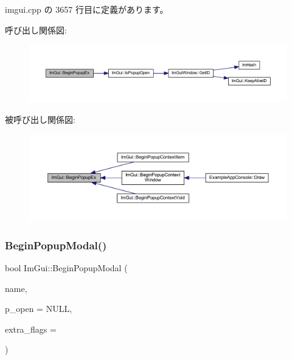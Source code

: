  imgui.\+cpp の 3657 行目に定義があります。

呼び出し関係図\+:\nopagebreak
\begin{figure}[H]
\begin{center}
\leavevmode
\includegraphics[width=350pt]{namespace_im_gui_a89da3a22300e8293257b6cfdf1b83b7a_cgraph}
\end{center}
\end{figure}
被呼び出し関係図\+:\nopagebreak
\begin{figure}[H]
\begin{center}
\leavevmode
\includegraphics[width=350pt]{namespace_im_gui_a89da3a22300e8293257b6cfdf1b83b7a_icgraph}
\end{center}
\end{figure}
\mbox{\label{namespace_im_gui_aa70aaf1dacf5702f85feca6f729a307a}} 
\subsubsection{\texorpdfstring{Begin\+Popup\+Modal()}{BeginPopupModal()}}
{\footnotesize\ttfamily bool Im\+Gui\+::\+Begin\+Popup\+Modal (\begin{DoxyParamCaption}\item[{const char $\ast$}]{name,  }\item[{bool $\ast$}]{p\+\_\+open = {\ttfamily NULL},  }\item[{\mbox{\hyperlink{imgui_8h_a0b8e067ab4f7a818828c8d89e531addc}{Im\+Gui\+Window\+Flags}}}]{extra\+\_\+flags = {} }\end{DoxyParamCaption})}



